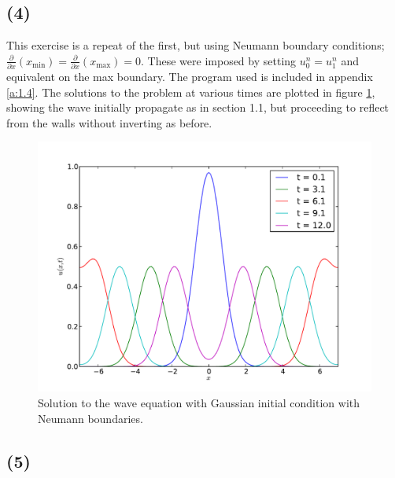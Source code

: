 \documentclass[10pt]{article}
\begin{document}
\subsection*{(4)}
This exercise is a repeat of the first, but using Neumann boundary conditions;
$\frac{\partial}{\partial x}(x_\text{min}) = \frac{\partial}{\partial x}(x_\text{max})
= 0$.
These were imposed by setting $u_0 ^n = u_1^n$ and equivalent on the max boundary.
The program used is included in appendix \ref{a:1.4}.
The solutions to the problem at various times are plotted in figure \ref{f:neumann},
showing the wave initially propagate as in section 1.1, but proceeding to reflect
from the walls without inverting as before.
\begin{figure}
  \centering
  \includegraphics[width=\textwidth]{1/neumann.pdf}
  \caption{Solution to the wave equation with Gaussian initial condition
           with Neumann boundaries.}
  \label{f:neumann}
\end{figure}


\clearpage
\subsection*{(5)}
\end{document}

